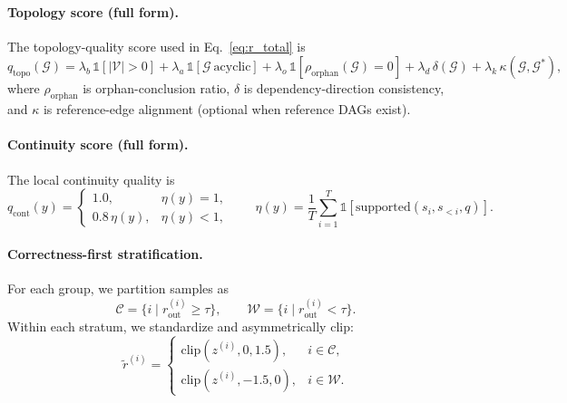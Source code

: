     \paragraph{Topology score (full form).}
    The topology-quality score used in Eq.~\ref{eq:r_total} is
    \begin{equation}
    \label{eq:r_topo}
    q_{\mathrm{topo}}(\mathcal{G}) =
    \lambda_b\,\mathbb{1}[|\mathcal{V}|>0]
    +\lambda_a\,\mathbb{1}[\mathcal{G}\ \text{acyclic}]
    +\lambda_o\,\mathbb{1}[\rho_{\mathrm{orphan}}(\mathcal{G})=0]
    +\lambda_d\,\delta(\mathcal{G})
    +\lambda_k\,\kappa(\mathcal{G},\mathcal{G}^{*}),
    \end{equation}
    where $\rho_{\mathrm{orphan}}$ is orphan-conclusion ratio, $\delta$ is dependency-direction consistency, and $\kappa$ is reference-edge alignment (optional when reference DAGs exist).
    
    \paragraph{Continuity score (full form).}
    The local continuity quality is
    \begin{equation}
    \label{eq:r_cont}
    q_{\mathrm{cont}}(y)=
    \begin{cases}
    1.0, & \eta(y)=1,\\
    0.8\,\eta(y), & \eta(y)<1,
    \end{cases}
    \qquad
    \eta(y)=\frac{1}{T}\sum_{i=1}^{T}\mathbb{1}[\mathrm{supported}(s_i,s_{<i},q)].
    \end{equation}
    
    \paragraph{Correctness-first stratification.}
    For each group, we partition samples as
    \begin{equation}
    \label{eq:scae_partition}
    \mathcal{C}=\{i\mid r_{\mathrm{out}}^{(i)}\ge\tau\},
    \qquad
    \mathcal{W}=\{i\mid r_{\mathrm{out}}^{(i)}<\tau\}.
    \end{equation}
    Within each stratum, we standardize and asymmetrically clip:
    \begin{equation}
    \label{eq:scae_shape}
    \tilde{r}^{(i)}=
    \begin{cases}
    \mathrm{clip}(z^{(i)},0,1.5), & i\in\mathcal{C},\\
    \mathrm{clip}(z^{(i)},-1.5,0), & i\in\mathcal{W}.
    \end{cases}
    \end{equation}
    
